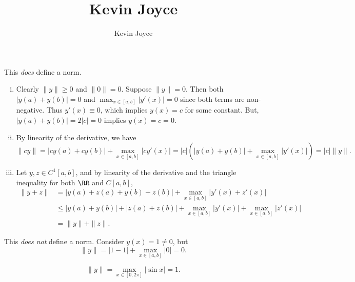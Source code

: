 \documentclass{homework}
\title{Kevin Joyce}
\author{Kevin Joyce}
\begin{document}
 
\newcommand{\figref}[1]{\figurename~\ref{#1}}
\renewcommand{\bar}{\overline}
\renewcommand{\hat}{\widehat}
\renewcommand{\SS}{\mathcal S}
\newcommand{\eps}{\varepsilon}
\newcommand{\TTheta}{\overline{\underline \Theta} }
\newcommand{\del}{\partial}
\newcommand{\approxsim}{\overset{\cdotp}{\underset{\cdotp}{\sim}}}



\begin{solution}
This \emph{does} define a norm.  
\begin{enumerate}[(i)]
\item Clearly $\| y\| \ge 0$ and $\| 0 \| = 0$.  Suppose $\| y \| = 0$.  Then both $|y(a) + y(b)| = 0$ and $\max_{x\in[a,b]}|y'(x)| = 0$ since both terms are non-negative. Thus $y'(x) \equiv 0$, which implies $y(x) = c$ for some constant. But, $|y(a) + y(b)| = 2|c| = 0$ implies $y(x) = c = 0$.
\item By linearity of the derivative, we have 
$$
  \|c y\| = |c y(a) + c y(b)| + \max_{x\in[a,b]} |c y'(x)| = |c| (|y(a) + y(b)| + \max_{x\in[a,b]} |y'(x)|) = |c|\|y\|.
$$
\item Let $y,z \in C^1[a,b]$, and by linearity of the derivative and the triangle inequality for both $\RR$ and $C[a,b]$,
\begin{align*}
  \|y + z\| 
  &= |y(a) + z(a) + y(b) + z(b)| + \max_{x\in[a,b]} |y'(x) + z'(x)| \\
  &\le |y(a) + y(b)| + |z(a) + z(b)| + \max_{x\in[a,b]} |y'(x)| + \max_{x\in[a,b]}|z'(x)| \\
  &= \|y\| + \|z\|.
\end{align*}
\end{enumerate}
\end{solution}


\begin{solution}
This \emph{does not} define a norm.  Consider $y(x) = 1 \not= 0$, but 
$$
  \| y \| = |1 - 1| + \max_{x\in[a,b]}|0| = 0.
$$
\end{solution}


\begin{solution}
$$
\|y\| = \max_{x\in[0,2\pi]} |\sin x| = 1.  
$$
\end{solution}
\end{document}
